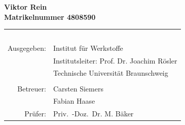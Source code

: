 \begin{titlepage}
 \textbf{\large Viktor Rein} \\[0.5ex]
 \textbf{Matrikelnummer 4808590}
 

 

 



 \vspace*{2.5cm}

 \begin{table}[htbp]
  \begin{center}
   \begin{tabular}{rl} 
     \parbox{0.33\textwidth}{\mbox{ }} & \parbox{0.66\textwidth}{\mbox{ }} \\
     Ausgegeben: & Institut für Werkstoffe \\
                 & Institutsleiter: Prof. Dr. Joachim Rösler \\
                 & Technische Universit\"at Braunschweig \\
                 &  \\
       Betreuer: & Carsten Siemers\\
       			 & Fabian Haase\\
 Prüfer: & Priv.~-Doz.~Dr. M. Bäker \\
   \end{tabular}
  \end{center}
 \end{table}



\end{titlepage}

